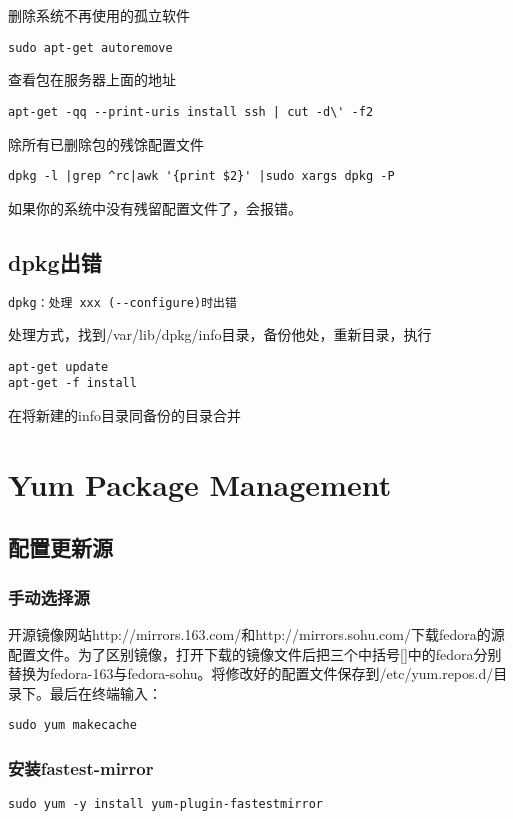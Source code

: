 删除系统不再使用的孤立软件
\begin{verbatim}
sudo apt-get autoremove
\end{verbatim}

查看包在服务器上面的地址
\begin{verbatim}
apt-get -qq --print-uris install ssh | cut -d\' -f2
\end{verbatim}

除所有已删除包的残馀配置文件
\begin{verbatim}
dpkg -l |grep ^rc|awk '{print $2}' |sudo xargs dpkg -P 
\end{verbatim}
如果你的系统中没有残留配置文件了，会报错。

\subsection{dpkg出错}
\label{err:dpkgConfig}
\begin{verbatim}
dpkg：处理 xxx (--configure)时出错
\end{verbatim}
处理方式，找到/var/lib/dpkg/info目录，备份他处，重新目录，执行
\begin{verbatim}
apt-get update
apt-get -f install
\end{verbatim}
在将新建的info目录同备份的目录合并

\section{Yum Package Management}
\label{yum}
\subsection{配置更新源}
\subsubsection{手动选择源}
开源镜像网站http://mirrors.163.com/和http://mirrors.sohu.com/下载fedora的源配置文件。为了区别镜像，打开下载的镜像文件后把三个中括号[]中的fedora分别替换为fedora-163与fedora-sohu。将修改好的配置文件保存到/etc/yum.repos.d/目录下。最后在终端输入：
\begin{lstlisting}
sudo yum makecache
\end{lstlisting}

\subsubsection{安装fastest-mirror}
\begin{lstlisting}
sudo yum -y install yum-plugin-fastestmirror 
\end{lstlisting}

